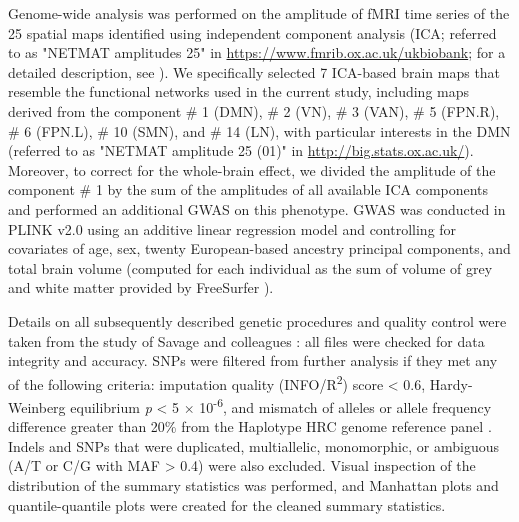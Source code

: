 \begin{refsection}
Genome-wide analysis was performed on the amplitude of fMRI time series of the 25 spatial maps identified using independent component analysis (ICA; referred to as "NETMAT amplitudes 25"  in \url{https://www.fmrib.ox.ac.uk/ukbiobank}; for a detailed description, see \citep{elliott2018genome,Miller2016MultimodalPB}). We specifically selected 7 ICA-based brain maps that resemble the functional networks used in the current study, including maps derived from the component \# 1 (DMN), \# 2 (VN), \# 3 (VAN), \# 5 (FPN.R), \# 6 (FPN.L), \# 10 (SMN), and \# 14 (LN), with particular interests in the DMN (referred to as "NETMAT amplitude 25 (01)" in \url{http://big.stats.ox.ac.uk/}). Moreover, to correct for the whole-brain effect, we divided the amplitude of the component \# 1 by the sum of the amplitudes of all available ICA components and performed an additional GWAS on this phenotype. GWAS was conducted in PLINK v2.0 \citep{Purcell2007PLINKAT} using an additive linear regression model and controlling for covariates of age, sex, twenty European-based ancestry principal components, and total brain volume (computed for each individual as the sum of volume of grey and white matter provided by FreeSurfer \citep{FISCHL2012Freesurfer}).

Details on all subsequently described genetic procedures and quality control were taken from the study of Savage and colleagues \citep{Savage2018GenomewideAM}: all files were checked for data integrity and accuracy. SNPs were filtered from further analysis if they met any of the following criteria: imputation quality (INFO/R\textsuperscript{2}) score < 0.6, Hardy-Weinberg equilibrium \textit{p} < 5 $ \times $  10\textsuperscript{-6}, and mismatch of alleles or allele frequency difference greater than 20\%  from the Haplotype HRC genome reference panel \citep{McCarthy2016ARP}. Indels and SNPs that were duplicated, multiallelic, monomorphic, or ambiguous (A/T or C/G with MAF > 0.4) were also excluded. Visual inspection of the distribution of the summary statistics was performed, and Manhattan plots and quantile-quantile plots were created for the cleaned summary statistics.\\


\end{refsection}
